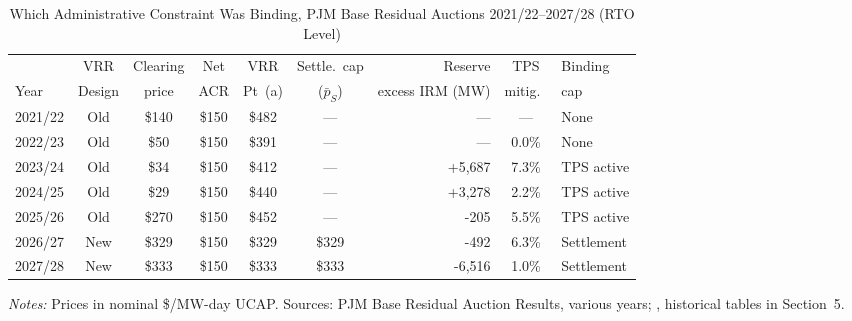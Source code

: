 \begin{table}[H]
  \centering
  \caption{Which Administrative Constraint Was Binding,
    PJM Base Residual Auctions 2021/22--2027/28 (RTO Level)}
  \label{tab:cap_incidence}
  \small
  \begin{tabular}{lcccccrcl}
    \toprule
             & VRR     & Clearing & Net      & VRR     & Settle.\ cap        & Reserve   & TPS     & Binding   \\
    Year     & Design  & price    & ACR      & Pt~(a)  & ($\bar p_S$)        & excess IRM (MW) & mitig.\ & cap       \\
    \midrule
    2021/22 & Old & \$140 & \$150 & \$482 & --- & --- & --- & None \\
    2022/23 & Old & \$50 & \$150 & \$391 & --- & --- & 0.0\% & None \\
    2023/24 & Old & \$34 & \$150 & \$412 & --- & +5,687 & 7.3\% & TPS active \\
    2024/25 & Old & \$29 & \$150 & \$440 & --- & +3,278 & 2.2\% & TPS active \\
    2025/26 & Old & \$270 & \$150 & \$452 & --- & -205 & 5.5\% & TPS active \\
    2026/27 & New & \$329 & \$150 & \$329 & \$329 & -492 & 6.3\% & Settlement \\
    2027/28 & New & \$333 & \$150 & \$333 & \$333 & -6,516 & 1.0\% & Settlement \\
    \bottomrule
  \end{tabular}
  \vspace{3pt}

  \begin{minipage}{0.96\textwidth}
    \footnotesize \textit{Notes:} Prices in nominal \$/MW-day UCAP. Sources:
    PJM Base Residual Auction Results, various years;
    \citet{MonitoringAnalytics2025_sotm}, historical tables in
    Section~5.
  \end{minipage}
\end{table}
